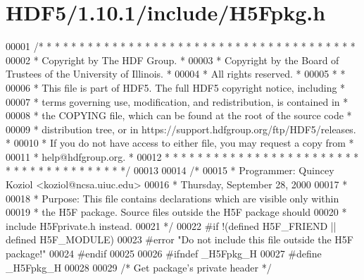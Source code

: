 \hypertarget{_h_d_f5_21_810_81_2include_2_h5_fpkg_8h_source}{}\section{H\+D\+F5/1.10.1/include/\+H5\+Fpkg.h}
\label{_h_d_f5_21_810_81_2include_2_h5_fpkg_8h_source}

\begin{DoxyCode}
00001 \textcolor{comment}{/* * * * * * * * * * * * * * * * * * * * * * * * * * * * * * * * * * * * * * *}
00002 \textcolor{comment}{ * Copyright by The HDF Group.                                               *}
00003 \textcolor{comment}{ * Copyright by the Board of Trustees of the University of Illinois.         *}
00004 \textcolor{comment}{ * All rights reserved.                                                      *}
00005 \textcolor{comment}{ *                                                                           *}
00006 \textcolor{comment}{ * This file is part of HDF5.  The full HDF5 copyright notice, including     *}
00007 \textcolor{comment}{ * terms governing use, modification, and redistribution, is contained in    *}
00008 \textcolor{comment}{ * the COPYING file, which can be found at the root of the source code       *}
00009 \textcolor{comment}{ * distribution tree, or in https://support.hdfgroup.org/ftp/HDF5/releases.  *}
00010 \textcolor{comment}{ * If you do not have access to either file, you may request a copy from     *}
00011 \textcolor{comment}{ * help@hdfgroup.org.                                                        *}
00012 \textcolor{comment}{ * * * * * * * * * * * * * * * * * * * * * * * * * * * * * * * * * * * * * * */}
00013 
00014 \textcolor{comment}{/*}
00015 \textcolor{comment}{ * Programmer:  Quincey Koziol <koziol@ncsa.uiuc.edu>}
00016 \textcolor{comment}{ *      Thursday, September 28, 2000}
00017 \textcolor{comment}{ *}
00018 \textcolor{comment}{ * Purpose: This file contains declarations which are visible only within}
00019 \textcolor{comment}{ *      the H5F package.  Source files outside the H5F package should}
00020 \textcolor{comment}{ *      include H5Fprivate.h instead.}
00021 \textcolor{comment}{ */}
00022 \textcolor{preprocessor}{#if !(defined H5F\_FRIEND || defined H5F\_MODULE)}
00023 \textcolor{preprocessor}{#error "Do not include this file outside the H5F package!"}
00024 \textcolor{preprocessor}{#endif}
00025 
00026 \textcolor{preprocessor}{#ifndef \_H5Fpkg\_H}
00027 \textcolor{preprocessor}{#define \_H5Fpkg\_H}
00028 
00029 \textcolor{comment}{/* Get package's private header */}

\end{DoxyCode}
